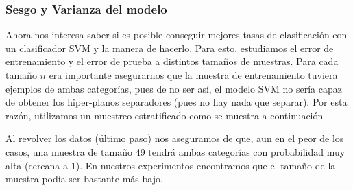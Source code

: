 \documentclass[a4paper, 10pt]{article}
\begin{document}
\subsubsection{Sesgo y Varianza del modelo}
Ahora nos interesa saber si es posible conseguir mejores tasas de clasificación con un clasificador SVM y la manera de hacerlo. Para esto, estudiamos el error de entrenamiento y el error de prueba a distintos tamaños de muestras. Para cada tamaño $n$ era importante asegurarnos que la muestra de entrenamiento tuviera ejemplos de ambas categorías, pues de no ser así, el modelo SVM no sería capaz de obtener los hiper-planos separadores (pues no hay nada que separar). Por esta razón, utilizamos un muestreo estratificado como se muestra a continuación

Al revolver los datos (último paso) nos aseguramos de que, aun en el peor de los casos, una muestra de tamaño 49 tendrá ambas categorías con probabilidad muy alta (cercana a 1). En nuestros experimentos encontramos que el tamaño de la muestra podía ser bastante más bajo. 
\end{document}
